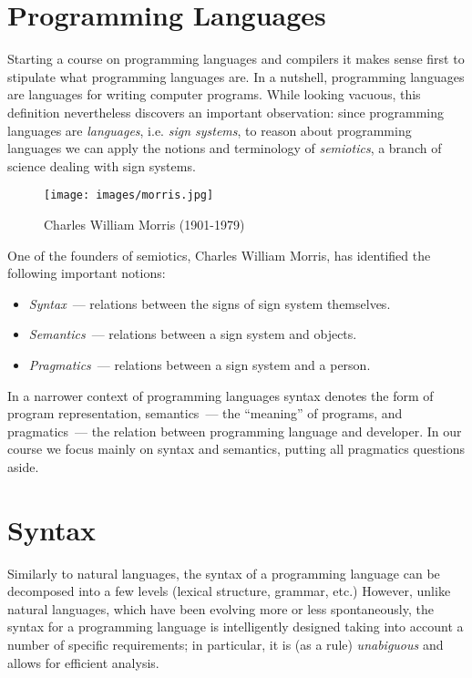 \lstset{
language=lama
}



\section{Programming Languages}

Starting a course on programming languages and compilers it makes sense first to stipulate what programming languages are. In a nutshell, programming languages
are languages for writing computer programs. While looking vacuous, this definition nevertheless discovers an important observation: since programming
languages are \emph{languages}, i.e. \emph{sign systems}, to reason about programming languages we can apply the notions and terminology of \emph{semiotics},
a branch of science dealing with sign systems.

\begin{figure}[h]
  \centering
  \texttt{[image: images/morris.jpg]}
  \caption{Charles William Morris (1901-1979)}
  \label{morris}
\end{figure}

One of the founders of semiotics, Charles William Morris, has identified the following important notions:

\begin{itemize}
\item \emph{Syntax}~--- relations between the signs of sign system themselves.
\item \emph{Semantics}~--- relations between a sign system and objects.
\item \emph{Pragmatics}~--- relations between a sign system and a person.
\end{itemize}

In a narrower context of programming languages syntax denotes the form of program representation, semantics~--- the ``meaning'' of programs, and pragmatics~---
the relation between programming language and developer. In our course we focus mainly on syntax and semantics, putting all pragmatics questions aside.

\section{Syntax}

Similarly to natural languages, the syntax of a programming language can be decomposed into a few levels (lexical structure, grammar, etc.) However,
unlike natural languages, which have been evolving more or less spontaneously, the syntax for a programming language is intelligently designed taking
into account a number of specific requirements; in particular, it is (as a rule) \emph{unabiguous} and allows for efficient analysis.

